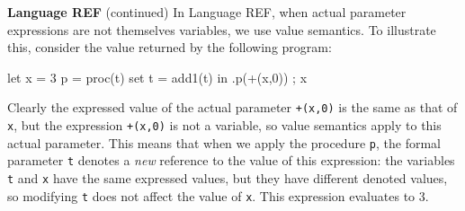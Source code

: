 \begin{minipage}[t]{\sw}
\slidenumber
\LARGE
{\bf Language REF} (continued)\exx
In Language REF,
when actual parameter expressions are not themselves variables,
we use value semantics.
To illustrate this, consider the value returned by the following program:
\begin{qv}
let
  x = 3
  p = proc(t) set t = add1(t)
in
  { .p(+(x,0)) ; x }
\end{qv}
Clearly the expressed value
of the actual parameter \verb'+(x,0)'
is the same as that of \verb'x',
but the expression \verb'+(x,0)' is not a variable,
so value semantics apply to this actual parameter.
This means that when we apply the procedure \verb'p',
the formal parameter \verb't' denotes
a {\em new} reference to the value of this expression:
the variables \verb't' and \verb'x' have the same expressed values,
but they have different denoted values,
so modifying \verb't' does not affect the value of \verb'x'.
This expression evaluates to 3.
\end{minipage}
\clearpage
